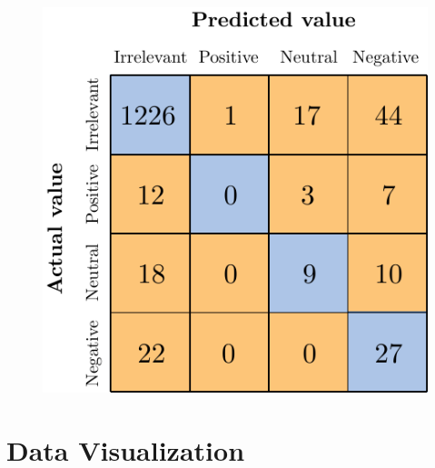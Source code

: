 \begin{figure}[H]
	\centering
	\includegraphics[scale=1]{figures/conf_matrices/ita_support/ita_cascade_support_bpef_tst.pdf}
	\label{fig:ita_cascade_support_bpef_tst}
\end{figure}




\section{Data Visualization}